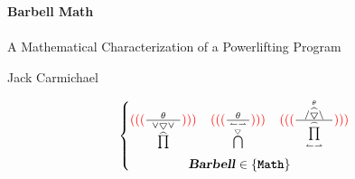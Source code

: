 \documentclass[footheight=20pt, footsepline, headheight=20pt, headsepline]{book}
\begin{document}

\begingroup
\thispagestyle{empty}
\centering
\vspace*{8cm}
\par\normalfont\fontsize{35}{35}\sffamily\selectfont
\textbf{Barbell Math}\\
\\
{\large A Mathematical Characterization of a Powerlifting Program}\par %
\vspace*{1cm}
{\Huge Jack Carmichael}\par %
\endgroup

\begin{figure*}[b]
\begin{equation*}
	\left\{\begin{matrix}
		{\color{red}(((}
		\frac{
			\;\;\;\;\;
			\theta
			\;\;\;\;\;
		}{
			\underset{
				\widehat{\prod}
			}{
				\vee\bigtriangledown\vee
			}
		}
		{\color{red})))}
		
		\;\;\;\;
		
		{\color{red}(((}
		\frac{
			\;\;\;
			\theta
			\;\;\;
		}{
			\bigcap 
			\limits^{
				\overset{\leftharpoonup \rightharpoonup }
				{\bigtriangledown_{}}}_{}  
		}
		{\color{red})))}
		
		\;\;\;\;

		{\color{red} (((}
		\frac{
			\;\;\; 
			/\overset{\theta}{\widehat{\bigtriangledown}} \setminus  
			\;\;\;
		}{
			{\prod\limits_{\leftharpoonup \rightharpoonup}^{\frown} }
		}
		{\color{red})))}
	 	\\
	 	\textbf{\textsl{Barbell}} \in \{ \texttt{\textbf{Math}} \}
	\end{matrix}\right.
\end{equation*}
\end{figure*}

%		
%		
%		
%
\end{document}
